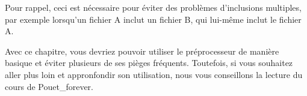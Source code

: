 \begin{infobox}
  Pour rappel, ceci est nécessaire pour
éviter des problèmes d'inclusions multiples, par exemple lorsqu'un
fichier A inclut un fichier B, qui lui-même inclut le fichier A.
\end{infobox}

\hrulefill

Avec ce chapitre, vous devriez pouvoir utiliser le préprocesseur de manière 
basique et éviter plusieurs de ses pièges fréquents. Toutefois, si vous 
souhaitez aller plus loin et appronfondir son utilisation, nous vous conseillons 
la lecture 
{du cours de Pouet\_forever}.